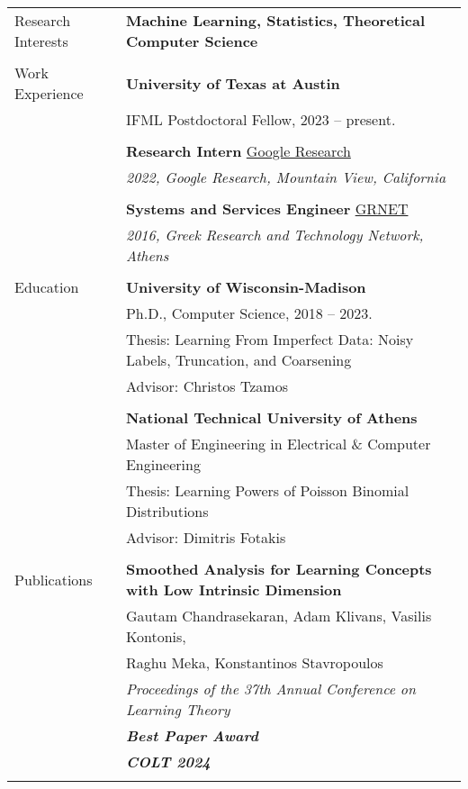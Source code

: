 \documentclass[letterpaper,11pt,oneside]{article}
\begin{document}
\noindent \begin{longtable}{@{} l l}
\Large{Research Interests} & \textbf{Machine Learning, Statistics, 
Theoretical Computer Science}
\\
&\\

\Large{Work Experience}

  & \textbf{University of Texas at Austin} \\
  & IFML Postdoctoral Fellow, 2023 -- present. \\
  & \\

  &\textbf{Research Intern} \href{https://research.google}{Google Research}\\
  & \emph{2022, Google Research, Mountain View, California}\\
  &\\
  
  &\textbf{Systems and Services Engineer} \href{https://grnet.gr/}{GRNET}\\
  & \emph{2016, Greek Research and Technology Network, Athens}\\
  &\\

 \Large{Education}


     & \textbf{University of Wisconsin-Madison} \\
     & Ph.D., Computer Science, 2018 -- 2023. \\
     & Thesis: Learning From Imperfect Data: Noisy Labels, Truncation, and Coarsening \\
     & Advisor: Christos Tzamos\\
     & \\

     & \textbf{National Technical University of Athens} \\
     & Master of Engineering in Electrical \& Computer Engineering\\
     & Thesis: Learning Powers of Poisson Binomial Distributions\\
     & Advisor: Dimitris Fotakis \\
     & \\

 \Large{Publications}

 &\textbf{Smoothed Analysis for Learning Concepts with Low Intrinsic Dimension} \\
 & Gautam Chandrasekaran, Adam Klivans, Vasilis Kontonis, \\
 & Raghu Meka, Konstantinos Stavropoulos \\
 & \emph{Proceedings of the 37th Annual Conference on Learning Theory} \\
 & \emph{\textbf{Best Paper Award}} \\
 & \emph{\textbf{COLT 2024}} \\
 & \\


\end{longtable}
\end{document}
